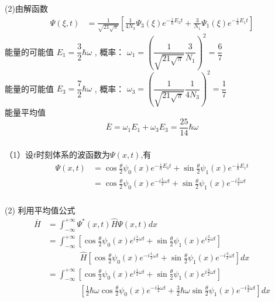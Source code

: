   \begin{frame}[label=current]
	\frametitle{}
  (2)由解函数 
  \[\begin{aligned}
    \Psi (\xi,t)  &= \frac{1}{\sqrt{21 \sqrt{\pi} }} \left[\frac{1}{4 N_3}\Psi_3(\xi) e^{-\frac{i}{\hbar} E_3 t}+ \frac{3}{N_1} \Psi_1(\xi)e^{-\frac{i}{\hbar} E_1 t} \right]
   \end{aligned} \]
  能量的可能值 $E_1 = \dfrac{3}{2} \hbar \omega $ , 概率： $\omega_1 = (\dfrac{1}{\sqrt{21 \sqrt{\pi} }} \dfrac{3}{N_1})^2 = \dfrac{6}{7}$ \\
  能量的可能值 $E_3 = \dfrac{7}{2} \hbar \omega $ , 概率： $\omega_3 = (\dfrac{1}{\sqrt{21 \sqrt{\pi} }} \dfrac{1}{4 N_3})^2 =\dfrac{1}{7}$ \\
  能量平均值 
  \[ \overline{E} = \omega_1 E_1 + \omega_3E_3 = \frac{25}{14}\hbar \omega \]
  \end{frame} 

  \begin{frame}
    \frametitle{}
  \vspace{0.3em}
  \解 （1）设$t$时刻体系的波函数为$\Psi(x, t)$,有
  \[
  \begin{aligned}
    \Psi(x, t) 
    &=  \cos \frac{\theta}{2} \psi_0(x) e^{-\frac{i}{\hbar}E_0t} + \sin \frac{\theta}{2} \psi_1(x) e^{-\frac{i}{\hbar}E_1 t} \\
    &= \cos \frac{\theta}{2} \psi_0(x) e^{-i\frac{1}{2}\omega t} + \sin \frac{\theta}{2} \psi_1(x) e^{-i\frac{3}{2}\omega t}
  \end{aligned}  
  \]
  \end{frame} 

  \begin{frame}
    \frametitle{}
  (2) 利用平均值公式
  \[
    \begin{aligned}
     \overline{H} &= \int_{-\infty}^{+\infty} \Psi ^*(x, t) \hat{H} \Psi(x, t) dx \\
     &= \int_{-\infty}^{+\infty} \left[\cos \frac{\theta}{2} \psi_0(x) e^{i\frac{1}{2}\omega t} + \sin \frac{\theta}{2} \psi_1(x) e^{i\frac{3}{2}\omega t} \right] \\
     &\hspace{4em}\hat{H} \left[\cos \frac{\theta}{2} \psi_0(x) e^{-i\frac{1}{2}\omega t} + \sin \frac{\theta}{2} \psi_1(x) e^{-i\frac{3}{2}\omega t} \right] dx \\
     &= \int_{-\infty}^{+\infty} \left[\cos \frac{\theta}{2} \psi_0(x) e^{i\frac{1}{2}\omega t} + \sin \frac{\theta}{2} \psi_1(x) e^{i\frac{3}{2}\omega t} \right] \\
     &\hspace{4em} \left[\frac{1}{2}\hbar \omega \cos \frac{\theta}{2} \psi_0(x) e^{-i\frac{1}{2}\omega t} + \frac{3}{2}\hbar \omega \sin \frac{\theta}{2} \psi_1(x) e^{-i\frac{3}{2}\omega t} \right] dx \\
    \end{aligned}     
    \]
  \end{frame} 

